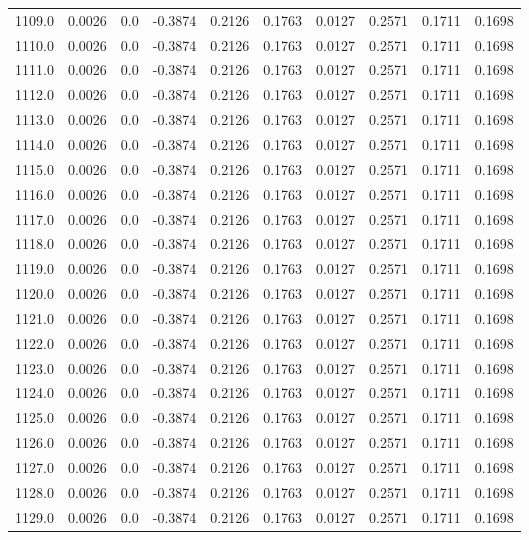 \begin{longtable}{lrrrrrrrrr}
1109.0 & 0.0026 & 0.0 & -0.3874 & 0.2126 & 0.1763 & 0.0127 & 0.2571 & 0.1711 & 0.1698 \\
1110.0 & 0.0026 & 0.0 & -0.3874 & 0.2126 & 0.1763 & 0.0127 & 0.2571 & 0.1711 & 0.1698 \\
1111.0 & 0.0026 & 0.0 & -0.3874 & 0.2126 & 0.1763 & 0.0127 & 0.2571 & 0.1711 & 0.1698 \\
1112.0 & 0.0026 & 0.0 & -0.3874 & 0.2126 & 0.1763 & 0.0127 & 0.2571 & 0.1711 & 0.1698 \\
1113.0 & 0.0026 & 0.0 & -0.3874 & 0.2126 & 0.1763 & 0.0127 & 0.2571 & 0.1711 & 0.1698 \\
1114.0 & 0.0026 & 0.0 & -0.3874 & 0.2126 & 0.1763 & 0.0127 & 0.2571 & 0.1711 & 0.1698 \\
1115.0 & 0.0026 & 0.0 & -0.3874 & 0.2126 & 0.1763 & 0.0127 & 0.2571 & 0.1711 & 0.1698 \\
1116.0 & 0.0026 & 0.0 & -0.3874 & 0.2126 & 0.1763 & 0.0127 & 0.2571 & 0.1711 & 0.1698 \\
1117.0 & 0.0026 & 0.0 & -0.3874 & 0.2126 & 0.1763 & 0.0127 & 0.2571 & 0.1711 & 0.1698 \\
1118.0 & 0.0026 & 0.0 & -0.3874 & 0.2126 & 0.1763 & 0.0127 & 0.2571 & 0.1711 & 0.1698 \\
1119.0 & 0.0026 & 0.0 & -0.3874 & 0.2126 & 0.1763 & 0.0127 & 0.2571 & 0.1711 & 0.1698 \\
1120.0 & 0.0026 & 0.0 & -0.3874 & 0.2126 & 0.1763 & 0.0127 & 0.2571 & 0.1711 & 0.1698 \\
1121.0 & 0.0026 & 0.0 & -0.3874 & 0.2126 & 0.1763 & 0.0127 & 0.2571 & 0.1711 & 0.1698 \\
1122.0 & 0.0026 & 0.0 & -0.3874 & 0.2126 & 0.1763 & 0.0127 & 0.2571 & 0.1711 & 0.1698 \\
1123.0 & 0.0026 & 0.0 & -0.3874 & 0.2126 & 0.1763 & 0.0127 & 0.2571 & 0.1711 & 0.1698 \\
1124.0 & 0.0026 & 0.0 & -0.3874 & 0.2126 & 0.1763 & 0.0127 & 0.2571 & 0.1711 & 0.1698 \\
1125.0 & 0.0026 & 0.0 & -0.3874 & 0.2126 & 0.1763 & 0.0127 & 0.2571 & 0.1711 & 0.1698 \\
1126.0 & 0.0026 & 0.0 & -0.3874 & 0.2126 & 0.1763 & 0.0127 & 0.2571 & 0.1711 & 0.1698 \\
1127.0 & 0.0026 & 0.0 & -0.3874 & 0.2126 & 0.1763 & 0.0127 & 0.2571 & 0.1711 & 0.1698 \\
1128.0 & 0.0026 & 0.0 & -0.3874 & 0.2126 & 0.1763 & 0.0127 & 0.2571 & 0.1711 & 0.1698 \\
1129.0 & 0.0026 & 0.0 & -0.3874 & 0.2126 & 0.1763 & 0.0127 & 0.2571 & 0.1711 & 0.1698 \\

\end{longtable}
